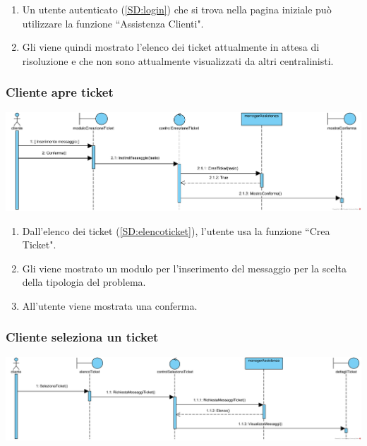 \documentclass[12pt,a4paper]{article}
\begin{document}
\begin{enumerate}
\item Un utente autenticato (\ref{SD:login}) che si trova nella pagina iniziale può utilizzare la funzione ``Assistenza Clienti".
\item Gli viene quindi mostrato l'elenco dei ticket attualmente in attesa di risoluzione e che non sono attualmente visualizzati da altri centralinisti.
\end{enumerate}

\subsubsection{Cliente apre ticket}
\label{SD:aperturaticket}

\begin{center}
\includegraphics[clip,width=\textwidth]{SequenceDiagram/ClienteTicketCreazione}
\end{center}

\begin{enumerate}
\item Dall'elenco dei ticket (\ref{SD:elencoticket}), l'utente usa la funzione ``Crea Ticket".
\item Gli viene mostrato un modulo per l'inserimento del messaggio per la scelta della tipologia del problema.
\item All'utente viene mostrata una conferma.
\end{enumerate}

\subsubsection{Cliente seleziona un ticket}
\label{SD:selezioneticketcliente}

\begin{center}
\includegraphics[width=\textwidth]{SequenceDiagram/ClienteTicketSeleziona}
\end{center}
\end{document}
